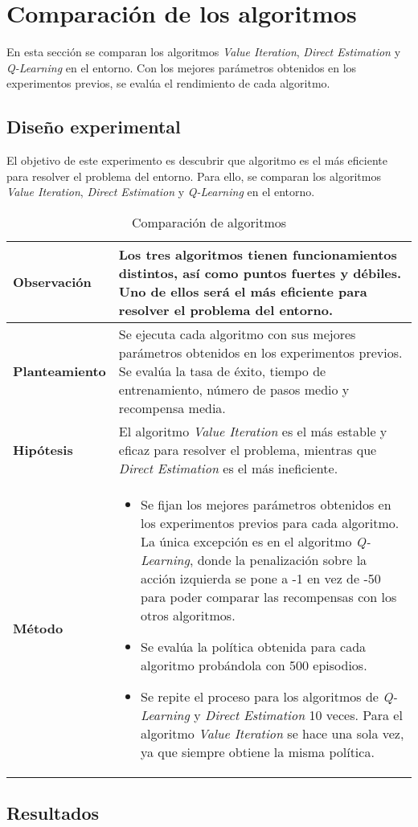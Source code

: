 \section{Comparación de los algoritmos}

En esta sección se comparan los algoritmos \textit{Value Iteration}, \textit{Direct Estimation} y \textit{Q-Learning} en el entorno. Con los mejores parámetros obtenidos en los experimentos previos, se evalúa el rendimiento de cada algoritmo.

\subsection{Diseño experimental}

El objetivo de este experimento es descubrir que algoritmo es el más eficiente para resolver el problema del entorno. Para ello, se comparan los algoritmos \textit{Value Iteration}, \textit{Direct Estimation} y \textit{Q-Learning} en el entorno.

\begin{table}[H]
    \centering
    \begin{tabularx}{\textwidth}{|p{4cm}|X|} %
        \hline %
        \textbf{Observación} & Los tres algoritmos tienen funcionamientos distintos, así como puntos fuertes y débiles. Uno de ellos será el más eficiente para resolver el problema del entorno.
        \\ \hline
        \textbf{Planteamiento} & Se ejecuta cada algoritmo con sus mejores parámetros obtenidos en los experimentos previos. Se evalúa la tasa de éxito, tiempo de entrenamiento, número de pasos medio y recompensa media.
        \\ \hline
        \textbf{Hipótesis} & El algoritmo \textit{Value Iteration} es el más estable y eficaz para resolver el problema, mientras que \textit{Direct Estimation} es el más ineficiente.
        \\ \hline
        \textbf{Método} & 
        \begin{itemize}
            \item Se fijan los mejores parámetros obtenidos en los experimentos previos para cada algoritmo. La única excepción es en el algoritmo \textit{Q-Learning}, donde la penalización sobre la acción izquierda se pone a -1 en vez de -50 para poder comparar las recompensas con los otros algoritmos.
            \item Se evalúa la política obtenida para cada algoritmo probándola con 500 episodios.
            \item Se repite el proceso para los algoritmos de \textit{Q-Learning} y \textit{Direct Estimation} 10 veces. Para el algoritmo \textit{Value Iteration} se hace una sola vez, ya que siempre obtiene la misma política.
        \end{itemize}
        \\ \hline
    \end{tabularx}
    \caption{Comparación de algoritmos}
    \label{tab:algorithmComparisonExp}
\end{table}

\subsection{Resultados}